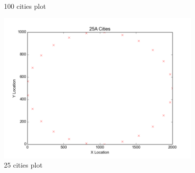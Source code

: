 \begin{figure}[h]
\begin{minipage}{0.5\textwidth}
	    \caption{100 cities plot}
	    \label{fig:100cities}
    \end{minipage}\hfill
	\begin{minipage}{0.5\textwidth}
	    \centering
	    \includegraphics[width=0.9\textwidth]{25cities_A.png}
	    \caption{25 cities plot}
	    \label{fig:25Acities}
    \end{minipage}\hfill
\end{figure}